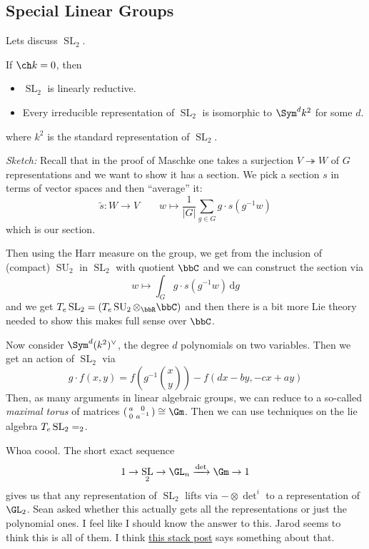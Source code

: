 \documentclass[12pt]{article}
\DeclareMathOperator{\SL}{SL}
\begin{document}
\subsection{Special Linear Groups}
Lets discuss $\SL_2$. 
\begin{thm}
	If $\ch k=0$, then 
	\begin{itemize}
		\item $\SL_2$ is linearly reductive.
		\item Every irreducible representation of $\SL_2$ is isomorphic to $\Sym^d k^2$ for some $d$.
	\end{itemize}
	where $k^2$ is the standard representation of $\SL_2$.
\end{thm}
\begin{prf}
	\textit{Sketch:} Recall that in the proof of Maschke one takes a surjection $V\twoheadrightarrow W$ 
	of $G$ representations and we want to show it has a section. We pick a section $s$ in terms of vector spaces and then ``average''
	it:
	\[\tilde s:W\to V\qquad w\mapsto\frac{1}{|G|}\sum_{g\in G}g\cdot s(g^{-1}w)\]
	which is our section.

	Then using the Harr measure on the group, we get from the inclusion of (compact) $\operatorname{SU}_2$ in $\SL_2$ with quotient $\bbC$
	and we can construct the section via 
	\[w\mapsto \int_Gg\cdot s(g^{-1}w)\,\mathrm{d}g\]
	and we get $T_e\SL_2=(T_e\operatorname{SU}_2\otimes_\bbR\bbC)$ and then there is a bit more Lie theory needed to show this makes full sense over $\bbC$.
\end{prf}

Now consider $\Sym^d(k^2)^\vee$, the degree $d$ polynomials on two variables. Then we get an action of $\SL_2$ via 
\[g\cdot f(x,y)=f(g^{-1}\binom{x}{y})-f(dx-by,-cx+ay)\]
Then, as many arguments in linear algebraic groups, we can reduce to a so-called \textit{maximal torus} 
of matrices $(\begin{smallmatrix}a & 0\\0 & a^{-1}\end{smallmatrix})\cong\Gm$. Then we can use techniques on the lie algebra 
$T_e\SL_2=\sl_2$.

Whoa coool. The short exact sequence 
\[1\to \SL_2\to \GL_n\xrightarrow{\det}\Gm\to 1\]
gives us that any representation of $\SL_2$ lifts via $-\otimes \det^i$ to a representation of $\GL_2$.
Sean asked whether this actually gets all the representations or just the polynomial ones. I feel like I should know the 
answer to this. Jarod seems to think this is all of them. I think \href{https://math.stackexchange.com/questions/694001/non-polynomial-representations-of-gl-n}{this stack post}
says something about that.
\end{document}
